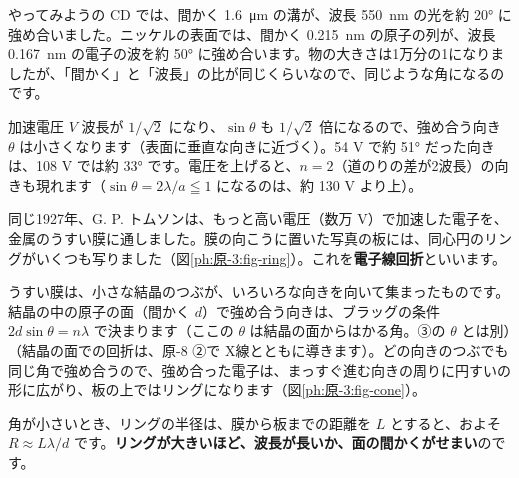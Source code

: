 \begin{phmijika}
やってみようの CD では、間かく \qty{1.6}{\micro m} の溝が、波長 \qty{550}{nm} の光を約 20° に強め合いました。ニッケルの表面では、間かく \qty{0.215}{nm} の原子の列が、波長 \qty{0.167}{nm} の電子の波を約 50° に強め合います。物の大きさは1万分の1になりましたが、「間かく」と「波長」の比が同じくらいなので、同じような角になるのです。
\end{phmijika}

\begin{phbaisuru}{加速電圧 $V$}
波長が $1/\sqrt2$ になり、$\sin\theta$ も $1/\sqrt2$ 倍になるので、強め合う向き $\theta$ は小さくなります（表面に垂直な向きに近づく）。54 V で約 51° だった向きは、108 V では約 33° です。電圧を上げると、$n=2$（道のりの差が2波長）の向きも現れます（$\sin\theta=2\lambda/a\leqq1$ になるのは、約 130 V より上）。
\end{phbaisuru}

\label{ph:原-3:sec4}
同じ1927年、G. P. トムソンは、もっと高い電圧（数万 V）で加速した電子を、金属のうすい膜に通しました。膜の向こうに置いた写真の板には、同心円のリングがいくつも写りました（図\ref{ph:原-3:fig-ring}）。これを\textbf{電子線回折}といいます。

\noindent\begin{minipage}[c]{0.5\linewidth}\raggedright
うすい膜は、小さな結晶のつぶが、いろいろな向きを向いて集まったものです。結晶の中の原子の面（間かく $d$）で強め合う向きは、ブラッグの条件 $2d\sin\theta=n\lambda$ で決まります（ここの $\theta$ は結晶の面からはかる角。③の $\theta$ とは別）（結晶の面での回折は、原-8 ②で X線とともに導きます）。どの向きのつぶでも同じ角で強め合うので、強め合った電子は、まっすぐ進む向きの周りに円すいの形に広がり、板の上ではリングになります（図\ref{ph:原-3:fig-cone}）。

角が小さいとき、リングの半径は、膜から板までの距離を $L$ とすると、およそ $R\approx L\lambda/d$ です。\textbf{リングが大きいほど、波長が長いか、面の間かくがせまい}のです。
\end{minipage}\hfill
\begin{minipage}[c]{0.47\linewidth}\centering
{}
\label{ph:原-3:fig-ring}
\end{minipage}

